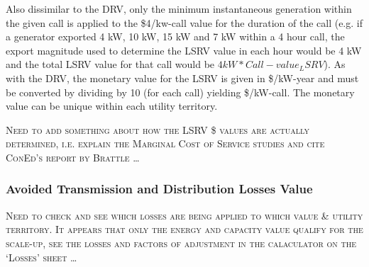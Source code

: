 Also dissimilar to the DRV, only the minimum instantaneous generation within the given call is applied to the \$4/kw-call value for the duration of the call (e.g. if a generator exported 4 kW, 10 kW, 15 kW and 7 kW within a 4 hour call, the export magnitude used to determine the LSRV value in each hour would be 4 kW and the total LSRV value for that call would be $4kW*Call-value_LSRV$). As with the DRV, the monetary value for the LSRV is given in \$/kW-year and must be converted by dividing by 10 (for each call) yielding \$/kW-call. The monetary value can be unique within each utility territory. %




\vspace*{10mm}
\begin{centering}
\textsc{Need to add something about how the LSRV \$ values are actually determined, i.e. explain the Marginal Cost of Service studies and cite ConEd's report by Brattle \ldots}
\end{centering}
\vspace*{10mm}


\subsubsection{Avoided Transmission and Distribution Losses Value}
\label{meth_val_atdlv}

\vspace*{10mm}
\begin{centering}
\textsc{Need to check and see which losses are being applied to which value \& utility territory. It appears that only the energy and capacity value qualify for the scale-up, see the losses and factors of adjustment in the calaculator on the `Losses' sheet \ldots}
\end{centering}
\vspace*{10mm}

